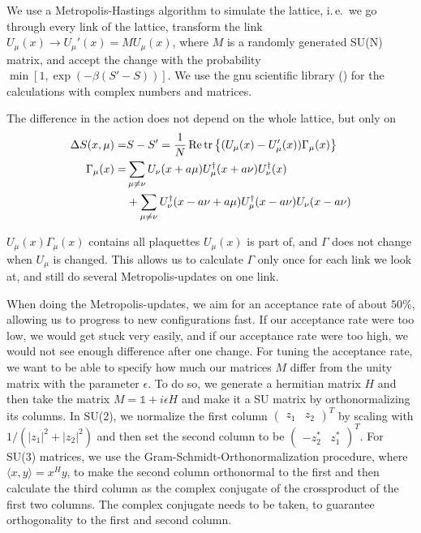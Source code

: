 \documentclass[%
 reprint,
 amsmath,amssymb,
 aps,
]{revtex4-1}
\renewcommand{\Re}{\operatorname{Re}}
\begin{document}
We use a Metropolis-Hastings algorithm to simulate the lattice, i.\,e.\, we go through every link of the lattice, transform the link $U_\mu(x)\to U_\mu'(x)=MU_\mu(x)$, where $M$ is a randomly generated SU(N) matrix, and accept the change with the probability $\min[1, \exp(-\beta(S'-S))]$. We use the gnu scientific library (\citet{gsldoc_total}) for the calculations with complex numbers and matrices.

The difference in the action does not depend on the whole lattice, but only on \begin{align*}
\Delta S(x, \mu)=&S-S'=\frac{1}{N}\Re\tr\left\lbrace (U_\mu(x)-U'_\mu(x))\Gamma_\mu(x)\right\rbrace\\
%
\Gamma_\mu(x)=&\sum_{\mu\neq\nu}U_\nu(x+a\mu)U_\mu^\dagger(x+a\nu)U_\nu^\dagger(x)\\
%
&+\sum_{\mu\neq\nu}U^\dagger_\nu(x-a\nu+a\mu) U^\dagger_\mu(x-a\nu)U_\nu(x-a\nu)
\end{align*}

$U_\mu(x)\Gamma_\mu(x)$ contains all plaquettes $U_\mu(x)$ is part of, and $\Gamma$ does not change when $U_\mu$ is changed. This allows us to calculate $\Gamma$ only once for each link we look at, and still do several Metropolis-updates on one link.

When doing the Metropolis-updates, we aim for an acceptance rate of about $50\%$, allowing us to progress to new configurations fast. If our acceptance rate were too low, we would get stuck very easily, and if our acceptance rate were too high, we would not see enough difference after one change.
For tuning the acceptance rate, we want to be able to specify how much our matrices $M$ differ from the unity matrix with the parameter $\epsilon$. To do so, we generate a hermitian matrix $H$   and then take the matrix $M=\mathbb{1}+i\epsilon H$ and make it a SU matrix by orthonormalizing its columns. In SU(2), we normalize the first column $\begin{pmatrix}z_1&z_2\end{pmatrix}^T$ by scaling with $1/(|z_1|^2+|z_2|^2)$ and then set the second column to be $\begin{pmatrix}-z_2^*&z_1^*\end{pmatrix}^T$. For SU(3) matrices, we use the Gram-Schmidt-Orthonormalization procedure, where $\langle x,y\rangle=x^Hy$, to make the second column orthonormal to the first and then calculate the third column as the complex conjugate of the crossproduct of the first two columns. The complex conjugate needs to be taken, to guarantee orthogonality to the first and second column.
\end{document}
